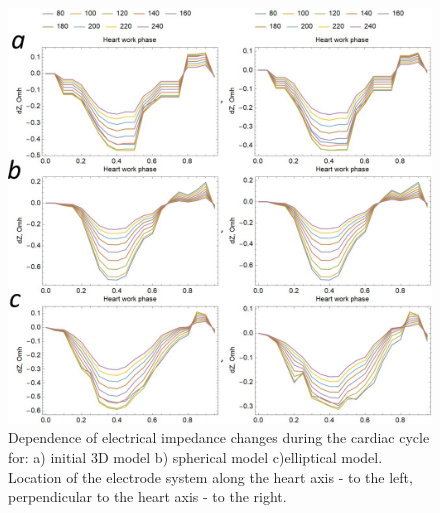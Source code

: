 \documentclass[conference]{IEEEtran}
\begin{document}
\begin{figure}[tbph]
    \centering
    \includegraphics[width=\linewidth]{fig/all}
    \caption{Dependence of electrical impedance changes during the cardiac cycle for: a) initial 3D model b) spherical model c)elliptical model. Location of the electrode system along the heart axis - to the left, perpendicular to the heart axis - to the right.}
    \label{fig:all}
\end{figure}


%
%
\end{document}
